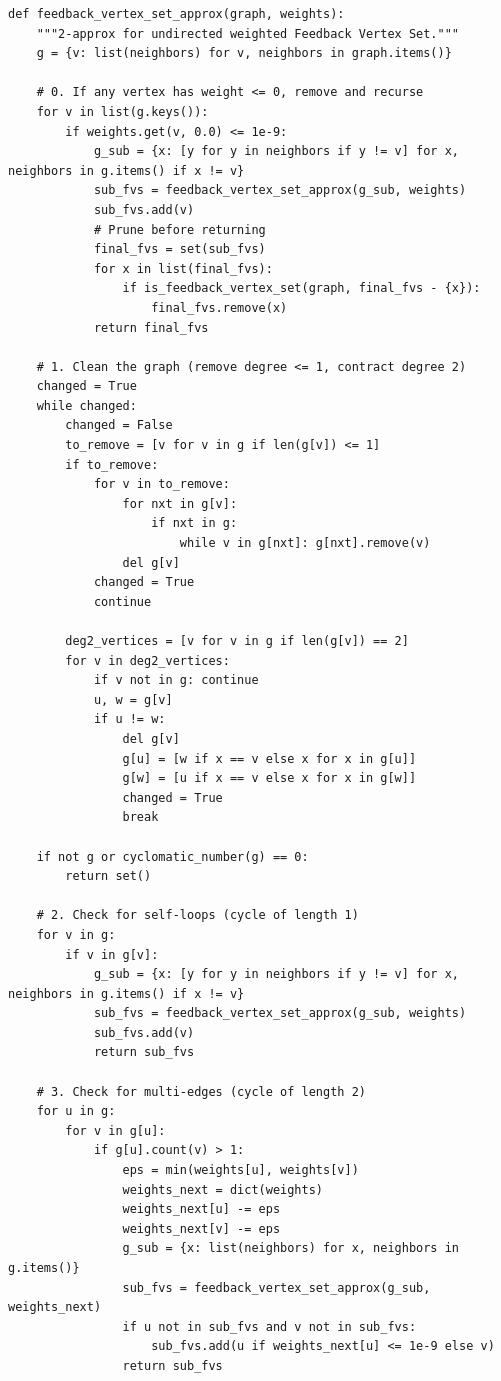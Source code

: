 \documentclass[11pt,oneside]{book}
\begin{document}
\begin{lstlisting}[style=python, caption=Local Ratio Algorithm for Feedback Vertex Set]
def feedback_vertex_set_approx(graph, weights):
    """2-approx for undirected weighted Feedback Vertex Set."""
    g = {v: list(neighbors) for v, neighbors in graph.items()}
    
    # 0. If any vertex has weight <= 0, remove and recurse
    for v in list(g.keys()):
        if weights.get(v, 0.0) <= 1e-9:
            g_sub = {x: [y for y in neighbors if y != v] for x, neighbors in g.items() if x != v}
            sub_fvs = feedback_vertex_set_approx(g_sub, weights)
            sub_fvs.add(v)
            # Prune before returning
            final_fvs = set(sub_fvs)
            for x in list(final_fvs):
                if is_feedback_vertex_set(graph, final_fvs - {x}):
                    final_fvs.remove(x)
            return final_fvs
            
    # 1. Clean the graph (remove degree <= 1, contract degree 2)
    changed = True
    while changed:
        changed = False
        to_remove = [v for v in g if len(g[v]) <= 1]
        if to_remove:
            for v in to_remove:
                for nxt in g[v]:
                    if nxt in g:
                        while v in g[nxt]: g[nxt].remove(v)
                del g[v]
            changed = True
            continue
            
        deg2_vertices = [v for v in g if len(g[v]) == 2]
        for v in deg2_vertices:
            if v not in g: continue
            u, w = g[v]
            if u != w:
                del g[v]
                g[u] = [w if x == v else x for x in g[u]]
                g[w] = [u if x == v else x for x in g[w]]
                changed = True
                break

    if not g or cyclomatic_number(g) == 0:
        return set()

    # 2. Check for self-loops (cycle of length 1)
    for v in g:
        if v in g[v]:
            g_sub = {x: [y for y in neighbors if y != v] for x, neighbors in g.items() if x != v}
            sub_fvs = feedback_vertex_set_approx(g_sub, weights)
            sub_fvs.add(v)
            return sub_fvs

    # 3. Check for multi-edges (cycle of length 2)
    for u in g:
        for v in g[u]:
            if g[u].count(v) > 1:
                eps = min(weights[u], weights[v])
                weights_next = dict(weights)
                weights_next[u] -= eps
                weights_next[v] -= eps
                g_sub = {x: list(neighbors) for x, neighbors in g.items()}
                sub_fvs = feedback_vertex_set_approx(g_sub, weights_next)
                if u not in sub_fvs and v not in sub_fvs:
                    sub_fvs.add(u if weights_next[u] <= 1e-9 else v)
                return sub_fvs


\end{lstlisting}
\end{document}
